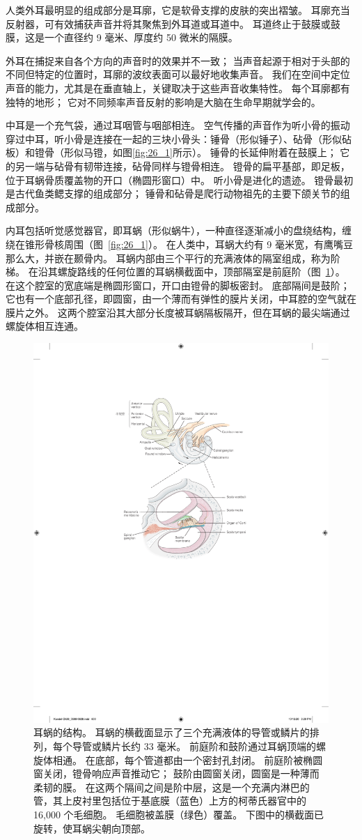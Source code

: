 人类外耳最明显的组成部分是耳廓，它是软骨支撑的皮肤的突出褶皱。 
耳廓充当反射器，可有效捕获声音并将其聚焦到外耳道或耳道中。 
耳道终止于鼓膜或鼓膜，这是一个直径约 9 毫米、厚度约 50 微米的隔膜。

外耳在捕捉来自各个方向的声音时的效果并不一致； 当声音起源于相对于头部的不同但特定的位置时，耳廓的波纹表面可以最好地收集声音。 
我们在空间中定位声音的能力，尤其是在垂直轴上，关键取决于这些声音收集特性。 
每个耳廓都有独特的地形； 它对不同频率声音反射的影响是大脑在生命早期就学会的。

中耳是一个充气袋，通过耳咽管与咽部相连。 
空气传播的声音作为听小骨的振动穿过中耳，听小骨是连接在一起的三块小骨头：锤骨（形似锤子）、砧骨（形似砧板）和镫骨（形似马镫，如图\ref{fig:26_1}所示）。 
锤骨的长延伸附着在鼓膜上； 它的另一端与砧骨有韧带连接，砧骨同样与镫骨相连。 
镫骨的扁平基部，即足板，位于耳蜗骨质覆盖物的开口（椭圆形窗口）中。 
听小骨是进化的遗迹。 
镫骨最初是古代鱼类鳃支撑的组成部分； 
锤骨和砧骨是爬行动物祖先的主要下颌关节的组成部分。


内耳包括听觉感觉器官，即耳蜗（形似蜗牛），一种直径逐渐减小的盘绕结构，缠绕在锥形骨核周围（图~\ref{fig:26_1}）。 
在人类中，耳蜗大约有 9 毫米宽，有鹰嘴豆那么大，并嵌在颞骨内。 
耳蜗内部由三个平行的充满液体的隔室组成，称为阶梯。
在沿其螺旋路线的任何位置的耳蜗横截面中，顶部隔室是前庭阶（图~\ref{fig:26_2}）。
在这个腔室的宽底端是椭圆形窗口，开口由镫骨的脚板密封。 
底部隔间是鼓阶； 它也有一个底部孔径，即圆窗，由一个薄而有弹性的膜片关闭，中耳腔的空气就在膜片之外。 
这两个腔室沿其大部分长度被耳蜗隔板隔开，但在耳蜗的最尖端通过螺旋体相互连通。

\begin{figure}[htbp]
	\centering
	\includegraphics[width=0.5\linewidth]{chap26/fig_26_2}
	\caption{耳蜗的结构。 
		耳蜗的横截面显示了三个充满液体的导管或鳞片的排列，每个导管或鳞片长约 33 毫米。 
		前庭阶和鼓阶通过耳蜗顶端的螺旋体相通。 
		在底部，每个管道都由一个密封孔封闭。 
		前庭阶被椭圆窗关闭，镫骨响应声音推动它； 鼓阶由圆窗关闭，圆窗是一种薄而柔韧的膜。 
		在这两个隔间之间是阶中层，这是一个充满内淋巴的管，其上皮衬里包括位于基底膜（蓝色）上方的柯蒂氏器官中的 16,000 个毛细胞。 
		毛细胞被盖膜（绿色）覆盖。 
		下图中的横截面已旋转，使耳蜗尖朝向顶部。}
	\label{fig:26_2}
\end{figure}


